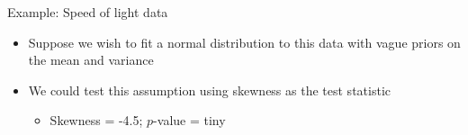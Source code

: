 \begin{frame}{Example: Speed of light data}
  \begin{center}
  \end{center}
  \begin{itemize}
    \pause
    \item Suppose we wish to fit a normal distribution to this data with vague priors on the mean and variance
    \vspace{\baselineskip}
    \pause
    \item We could test this assumption using skewness as the test statistic
    \pause
    \begin{itemize}
      \item Skewness = -4.5; $p$-value = tiny
    \end{itemize}
  \end{itemize}
\end{frame}

